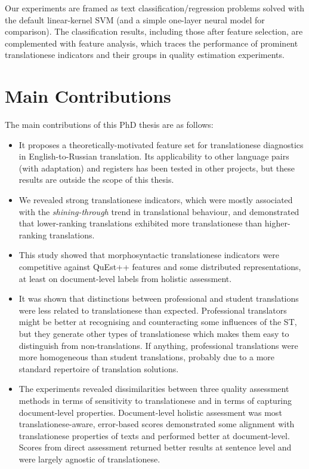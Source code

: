 Our experiments are framed as text classification/regression problems solved with the default linear-kernel \gls{SVM} (and a simple one-layer neural model for comparison). The classification results, including those after feature selection, are complemented with feature analysis, which traces the performance of prominent translationese indicators and their groups in quality estimation experiments.

\section{\label{sec:contributions}Main Contributions}

The main contributions of this PhD thesis are as follows: 

\begin{itemize}\compresslist{}	
	\item It proposes a theoretically-motivated feature set for translationese diagnostics in English-to-Russian translation. Its applicability to other language pairs (with adaptation) and registers has been tested in other projects, but these results are outside the scope of this thesis.
	
	\item We revealed strong translationese indicators, which were mostly associated with the \textit{shining-through} trend in translational behaviour, and demonstrated that lower-ranking translations exhibited more translationese than higher-ranking translations.  
	
	\item This study showed that morphosyntactic translationese indicators were competitive against QuEst++ features and some distributed representations, at least on document-level labels from holistic assessment. 
	
	\item It was shown that distinctions between professional and student translations were less related to translationese than expected. Professional translators might be better at recognising and counteracting some influences of the ST, but they generate other types of translationese which makes them easy to distinguish from non-translations. If anything, professional translations were more homogeneous than student translations, probably due to a more standard repertoire of translation solutions. 
	
	\item The experiments revealed dissimilarities between three quality assessment methods in terms of sensitivity to translationese and in terms of capturing document-level properties. Document-level holistic assessment was most translationese-aware, error-based scores demonstrated some alignment with translationese properties of texts and performed better at document-level. Scores from direct assessment returned better results at sentence level and were largely agnostic of translationese. 
	

\end{itemize}
